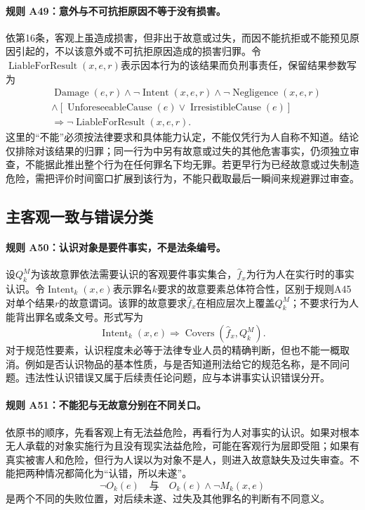 \paragraph{规则 A49：意外与不可抗拒原因不等于没有损害。}
依第16条，客观上虽造成损害，但非出于故意或过失，而因不能抗拒或不能预见原因引起的，不以该意外或不可抗拒原因造成的损害归罪。令$\operatorname{LiableForResult}(x,e,r)$表示因本行为的该结果而负刑事责任，保留结果参数写为
\[
\begin{aligned}
&\operatorname{Damage}(e,r)\land\neg\operatorname{Intent}(x,e,r)
\land\neg\operatorname{Negligence}(x,e,r)\\
&\land[\operatorname{UnforeseeableCause}(e)\lor
\operatorname{IrresistibleCause}(e)]\\
&\Longrightarrow\neg\operatorname{LiableForResult}(x,e,r).
\end{aligned}
\]
这里的“不能”必须按法律要求和具体能力认定，不能仅凭行为人自称不知道。结论仅排除对该结果的归罪；同一行为中另有故意或过失的其他危害事实，仍须独立审查，不能据此推出整个行为在任何罪名下均无罪。若更早行为已经故意或过失制造危险，需把评价时间窗口扩展到该行为，不能只截取最后一瞬间来规避罪过审查。

\subsection{主客观一致与错误分类}
\paragraph{规则 A50：认识对象是要件事实，不是法条编号。}
设$Q_k^M$为该故意罪依法需要认识的客观要件事实集合，$\widehat f_x$为行为人在实行时的事实认识。令$\operatorname{Intent}_k(x,e)$表示罪名$k$要求的故意要素总体符合性，区别于规则A45对单个结果$r$的故意谓词。该罪的故意要求$\widehat f_x$在相应层次上覆盖$Q_k^M$；不要求行为人能背出罪名或条文号。形式写为
\[
\operatorname{Intent}_k(x,e)
\Longrightarrow\operatorname{Covers}(\widehat f_x,Q_k^M).
\]
对于规范性要素，认识程度未必等于法律专业人员的精确判断，但也不能一概取消。例如是否认识物品的基本性质，与是否知道刑法给它的规范名称，是不同问题。违法性认识错误又属于后续责任论问题，应与本讲事实认识错误分开。

\paragraph{规则 A51：不能犯与无故意分别在不同关口。}
依原书的顺序，先看客观上有无法益危险，再看行为人对事实的认识。如果对根本无人承载的对象实施行为且没有现实法益危险，可能在客观行为层即受阻；如果有真实被害人和危险，但行为人误以为对象不是人，则进入故意缺失及过失审查。不能把两种情况都简化为“认错，所以未遂”。
\[
\neg O_k(e)\quad\text{与}\quad O_k(e)\land\neg M_k(x,e)
\]
是两个不同的失败位置，对后续未遂、过失及其他罪名的判断有不同意义。

